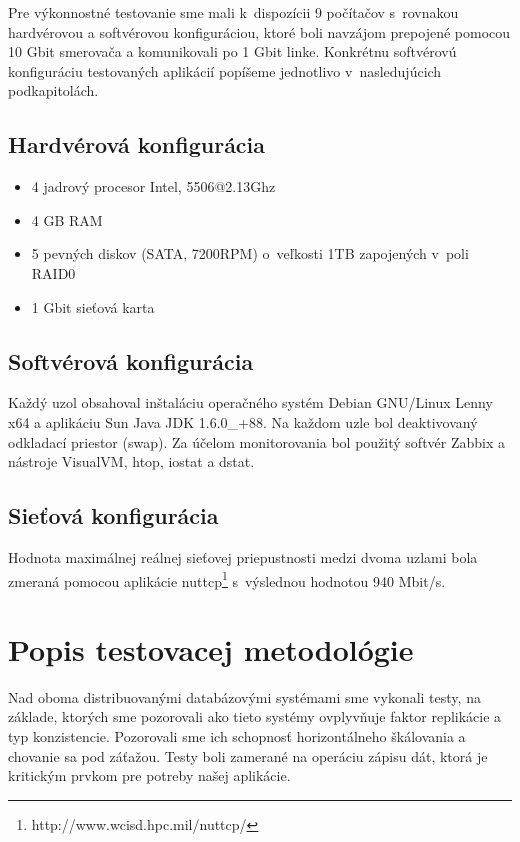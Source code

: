 \documentclass[11pt,twoside,a4paper]{book}
\begin{document}
Pre výkonnostné testovanie sme mali k~dispozícii 9 počítačov s~rovnakou hardvérovou a softvérovou konfiguráciou, ktoré boli navzájom prepojené pomocou 10 Gbit smerovača a komunikovali po 1 Gbit linke. Konkrétnu softvérovú konfiguráciu testovaných aplikácií popíšeme jednotlivo v~nasledujúcich podkapitolách.

\subsection*{Hardvérová konfigurácia}
\begin{itemize}
 \item 4 jadrový procesor Intel, 5506@2.13Ghz
 \item 4 GB RAM
 \item 5 pevných diskov (SATA, 7200RPM) o~veľkosti 1TB zapojených v~poli RAID0
 \item 1 Gbit sieťová karta
\end{itemize}

\subsection*{Softvérová konfigurácia} 
Každý uzol obsahoval inštaláciu operačného systém Debian GNU/Linux Lenny x64 a aplikáciu Sun Java JDK 1.6.0\_+88. Na každom uzle bol deaktivovaný odkladací priestor (swap). Za účelom monitorovania bol použitý softvér Zabbix a nástroje VisualVM, htop, iostat a dstat.

\subsection*{Sieťová konfigurácia}

Hodnota maximálnej reálnej sieťovej priepustnosti medzi dvoma uzlami bola zmeraná pomocou aplikácie nuttcp\footnote{http://www.wcisd.hpc.mil/nuttcp/} s~výslednou hodnotou 940 Mbit/s.

\section{Popis testovacej metodológie}

Nad oboma distribuovanými databázovými systémami sme vykonali testy, na základe, ktorých sme pozorovali ako tieto systémy ovplyvňuje faktor replikácie a typ konzistencie. Pozorovali sme ich schopnosť horizontálneho škálovania a chovanie sa pod záťažou. Testy boli zamerané na operáciu zápisu dát, ktorá je kritickým prvkom pre potreby našej aplikácie.
\end{document}
